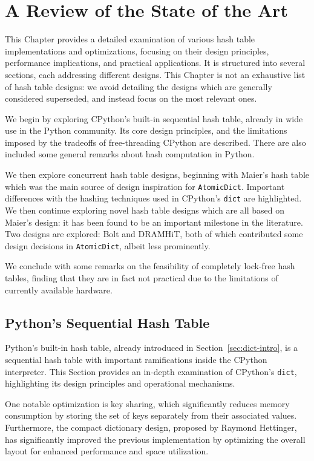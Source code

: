 \chapter{A Review of the State of the Art}\label{ch:review}

This Chapter provides a detailed examination of various hash table implementations and optimizations, focusing on their design principles, performance implications, and practical applications.
It is structured into several sections, each addressing different designs.
This Chapter is not an exhaustive list of hash table designs: we avoid detailing the designs which are generally considered superseded, and instead focus on the most relevant ones.

We begin by exploring CPython's built-in sequential hash table, already in wide use in the Python community.
Its core design principles, and the limitations imposed by the tradeoffs of free-threading CPython are described.
There are also included some general remarks about hash computation in Python.

We then explore concurrent hash table designs, beginning with Maier's hash table which was the main source of design inspiration for \texttt{AtomicDict}.
Important differences with the hashing techniques used in CPython's \texttt{dict} are highlighted.
We then continue exploring novel hash table designs which are all based on Maier's design: it has been found to be an important milestone in the literature.
Two designs are explored: Bolt and DRAMHiT, both of which contributed some design decisions in \texttt{AtomicDict}, albeit less prominently.

We conclude with some remarks on the feasibility of completely lock-free hash tables, finding that they are in fact not practical due to the limitations of currently available hardware.


\section{Python's Sequential Hash Table}\label{sec:python-dict-review}

Python's built-in hash table, already introduced in Section~\ref{sec:dict-intro}, is a sequential hash table with important ramifications inside the CPython interpreter.
This Section provides an in-depth examination of CPython's \texttt{dict}, highlighting its design principles and operational mechanisms.

One notable optimization is key sharing, which significantly reduces memory consumption by storing the set of keys separately from their associated values.
Furthermore, the compact dictionary design, proposed by Raymond Hettinger, has significantly improved the previous implementation by optimizing the overall layout for enhanced performance and space utilization.

